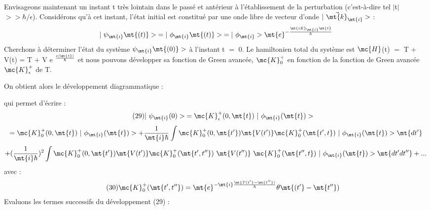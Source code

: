 Envisageons maintenant un instant t très lointain dans le
passé et antérieur à l'établissement de la perturbation (c'est-à-dire tel
$|$t$|$ $>>\hbar/\epsilon$). Considérons qu'à cet instant, l'état initial est constitué par
une onde libre de vecteur d'onde $|\ \vec{\mt{k}}_\mt{i}>$ :
\[
|\ \psi_\mt{i}\mt{(t)}>\;=|\ \phi_\mt{i}\mt{(t)}>\;=|\ \phi_\mt{i}>\mt{e}^{-\frac{\mt{i E}_\mt{i}\mt{ t}}{\hbar}}
\]
Cherchons à déterminer l'état du système $\psi_\mt{i}\mt{(0)}>$ à l'instant t $=$ 0. Le
hamiltonien total du système est $\mc{H}$(t) $=$ T + V(t) = T $+$ V e $^{\frac{\epsilon|\mt{t}|}{\hbar}}$ et
nous pouvons développer sa fonction de Green avancée, $\mc{K}_0^+$ en fonction de
la fonction de Green avancée $\mc{K}_\epsilon^+$ de T.

On obtient alors le développement diagrammatique :
\begin{center}
 \end{center}
qui permet d'écrire :
\[
\tag{29}|\ \psi_\mt{i}(0)>\;=\mc{K}_\epsilon^+(0,\mt{t})\ |\ \phi_\mt{i}(\mt{t})>
\]
\[
=\mc{K}_0^+(0,\mt{t})\ |\ \phi_\mt{i}(\mt{t})>+\frac{1}{\mt{i}\hbar}
\int\mc{K}_0^+(0,\mt{t'})\mt{ V(t') }\mc{K}_0^+(\mt{t', t})\ |\ \phi_\mt{i}(\mt{t})>\mt{ dt'}
\]
\[
+(\frac{1}{\mt{i}\hbar})^2
\int\mc{K}_0^+(0,\mt{t'})\mt{ V(t') }\mc{K}_0^+(\mt{t', t''})\ \mt{V(t'')}\ 
\mc{K}_0^+(\mt{t'', t})\ |\ \phi_\mt{i}(\mt{t})>\mt{ dt' dt''}+...
\]
avec :
\[
\tag{30}\mc{K}_0^+(\mt{t', t''})=\mt{e}^{-\mt{i}\frac{\mt{T(t'}-\mt{t''})}{\hbar}}\theta\mt{(t'}-\mt{t''})
\]
Evaluons les termes successifs du développement (29) :

